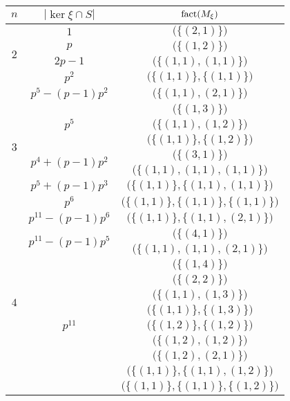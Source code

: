 \begin{table}[h]
\begin{tabular}{ccc}
\toprule
$n$&$|\ker\xi\cap S|$&$\operatorname{fact}(M_\xi)$\\
\midrule
\multirow{4}{*}{$2$}&$1$&$\big(\big\{(2,1)\big\}\big)$\\
\cmidrule(l){2-3}
&$p$&$\big(\big\{(1,2)\big\}\big)$\\
\cmidrule(l){2-3}
&$2p-1$&$\big(\big\{(1,1),(1,1)\big\}\big)$\\
\cmidrule(l){2-3}
&$p^2$&$\big(\big\{(1,1)\big\},\big\{(1,1)\big\}\big)$\\
\midrule
\multirow{8}{*}{$3$}&$p^5-(p-1)p^2$&$\big(\big\{(1,1),(2,1)\big\}\big)$\\
\cmidrule(l){2-3}
&\multirow{3}{*}{$p^5$}&$\big(\big\{(1,3)\big\}\big)$\\
&&$\big(\big\{(1,1),(1,2)\big\}\big)$\\
&&$\big(\big\{(1,1)\big\},\big\{(1,2)\big\}\big)$\\
\cmidrule(l){2-3}
&\multirow{2}{*}{$p^4+(p-1)p^2$}&$\big(\big\{(3,1)\big\}\big)$\\
&&$\big(\big\{(1,1),(1,1),(1,1)\big\}\big)$\\
\cmidrule(l){2-3}
&$p^5+(p-1)p^3$&$\big(\big\{(1,1)\big\},\big\{(1,1),(1,1)\big\}\big)$\\
\cmidrule(l){2-3}
&$p^6$&$\big(\big\{(1,1)\big\},\big\{(1,1)\big\},\big\{(1,1)\big\}\big)$\\
\midrule
\multirow{17}{*}{$4$}&$p^{11}-(p-1)p^6$&$\big(\big\{(1,1)\big\},\big\{(1,1),(2,1)\big\}\big)$\\
\cmidrule(l){2-3}
&\multirow{2}{*}{$p^{11}-(p-1)p^5$}&$\big(\big\{(4,1)\big\}\big)$\\
&&$\big(\big\{(1,1),(1,1),(2,1)\big\}\big)$\\
\cmidrule(l){2-3}
&\multirow{9}{*}{$p^{11}$}&$\big(\big\{(1,4)\big\}\big)$\\
&&$\big(\big\{(2,2)\big\}\big)$\\
&&$\big(\big\{(1,1),(1,3)\big\}\big)$\\
&&$\big(\big\{(1,1)\big\},\big\{(1,3)\big\}\big)$\\
&&$\big(\big\{(1,2)\big\},\big\{(1,2)\big\}\big)$\\
&&$\big(\big\{(1,2),(1,2)\big\}\big)$\\
&&$\big(\big\{(1,2),(2,1)\big\}\big)$\\
&&$\big(\big\{(1,1)\big\},\big\{(1,1),(1,2)\big\}\big)$\\
&&$\big(\big\{(1,1)\big\},\big\{(1,1)\big\},\big\{(1,2)\big\}\big)$\\

\end{tabular}
\end{table}
